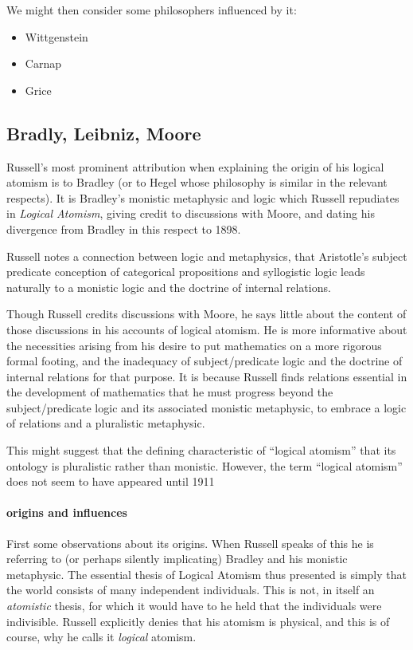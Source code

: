 \documentclass[10pt,titlepage]{article}
\begin{document}
We might then consider some philosophers influenced by it:

\begin{itemize}
\item Wittgenstein
\item Carnap
\item Grice
\end{itemize}
 
\subsection{Bradly, Leibniz, Moore}

Russell's most prominent attribution when explaining the origin of his logical atomism is to Bradley
(or to Hegel whose philosophy is similar in the relevant respects).
It is Bradley's monistic metaphysic and logic which Russell repudiates in {\it Logical Atomism}, giving
credit to discussions with Moore, and dating his divergence from Bradley in this respect to 1898.

Russell notes a connection between logic and metaphysics, that Aristotle's subject predicate conception of
categorical propositions and syllogistic logic leads naturally to a monistic logic and the doctrine of internal relations.

Though Russell credits discussions with Moore, he says little about the content of those discussions in his accounts of logical atomism.
He is more informative about the necessities arising from his desire to put mathematics on a more rigorous formal footing, and the inadequacy of subject/predicate logic and the doctrine of internal relations for that purpose.
It is because Russell finds relations essential in the development of mathematics that he must progress beyond the subject/predicate logic and its associated monistic metaphysic, to embrace a logic of relations and a pluralistic metaphysic.

This might suggest that the defining characteristic of ``logical atomism'' that its ontology is pluralistic rather than monistic.
However, the term ``logical atomism'' does not seem to have appeared until 1911

\paragraph{origins and influences}

First some observations about its origins.
When Russell speaks of this he is referring to (or perhaps silently implicating) Bradley and his monistic metaphysic.
The essential thesis of Logical Atomism thus presented is simply that the world consists of many independent individuals.
This is not, in itself an {\it atomistic} thesis, for which it would have to he held that the individuals were indivisible.
Russell explicitly denies that his atomism is physical, and this is of course, why he calls it {\it logical} atomism.
\end{document}
